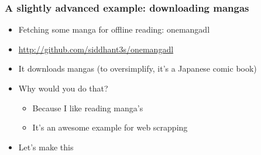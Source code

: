 \documentclass{beamer}
\begin{document}
\begin{frame}
\frametitle{A slightly advanced example: downloading mangas}
\label{sec-7_4}


\begin{itemize}
\item Fetching some manga for offline reading: onemangadl
\item \href{http://github.com/siddhant3s/onemangadl}{http://github.com/siddhant3s/onemangadl}
\item It downloads mangas (to oversimplify, it's a Japanese comic book)
\item Why would you do that?
\begin{itemize}
\item Because I like reading manga's
\item It's an awesome example for web scrapping
\end{itemize}
\item Let's make this
\end{itemize}
\end{frame}
\end{document}
